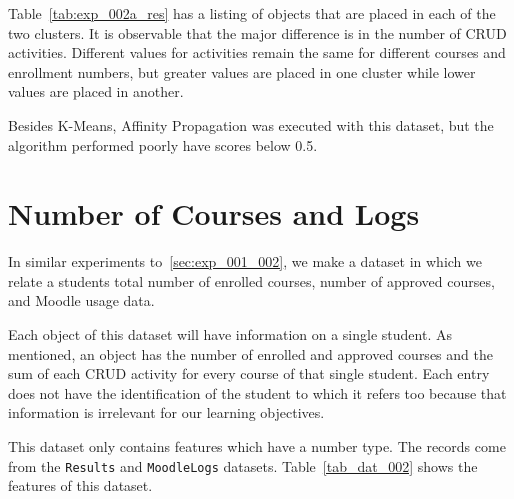 Table~\ref{tab:exp_002a_res} has a listing of objects that are placed in each
of the two clusters. It is observable that the major difference is in the
number of CRUD activities. Different values for activities remain the same for
different courses and enrollment numbers, but greater values are placed in one
cluster while lower values are placed in another.

Besides K-Means, Affinity Propagation was executed with this dataset, but the
algorithm performed poorly have scores below 0.5.

\section{Number of Courses and Logs}

In similar experiments to~\ref{sec:exp_001_002}, we make a dataset in which we
relate a students total number of enrolled courses,  number of approved
courses, and Moodle usage data.

Each object of this dataset will have information on a single student. As
mentioned, an object has the number of enrolled and approved courses and the
sum of each CRUD activity for every course of that single student. Each entry
does not have the identification of the student to which it refers too because
that information is irrelevant for our learning objectives.

This dataset only contains features which have a number type. The records come
from the \texttt{Results} and \texttt{MoodleLogs} datasets.
Table~\ref{tab_dat_002} shows the features of this dataset.

